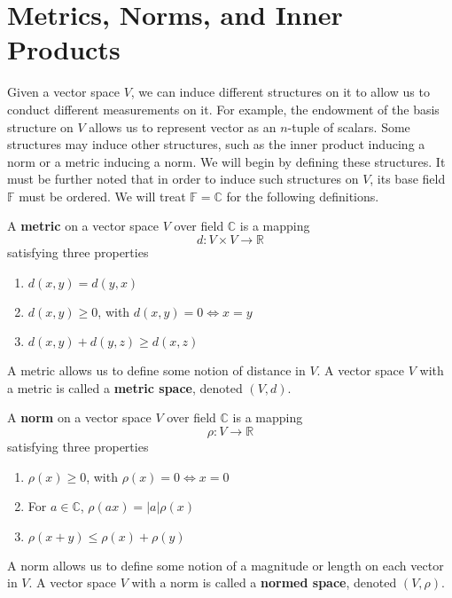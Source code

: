 \section{Metrics, Norms, and Inner Products} 

  Given a vector space $V$, we can induce different structures on it to allow us to conduct different measurements on it. For example, the endowment of the basis structure on $V$ allows us to represent vector as an $n$-tuple of scalars. Some structures may induce other structures, such as the inner product inducing a norm or a metric inducing a norm. We will begin by defining these structures. It must be further noted that in order to induce such structures on $V$, its base field $\mathbb{F}$ must be ordered. We will treat $\mathbb{F} = \mathbb{C}$ for the following definitions. 

  \begin{definition}[Metric]
    A \textbf{metric} on a vector space $V$ over field $\mathbb{C}$ is a mapping
    \begin{equation}
      d: V \times V \longrightarrow \mathbb{R}
    \end{equation}
    satisfying three properties 
    \begin{enumerate}
      \item $d(x, y) = d(y, x)$
      \item $d(x, y) \geq 0$, with $d(x,y) = 0 \iff x=y$
      \item $d(x, y) + d(y,z) \geq d(x,z)$
    \end{enumerate}
    A metric allows us to define some notion of distance in $V$. A vector space $V$ with a metric is called a \textbf{metric space}, denoted $(V, d)$. 
  \end{definition}

  \begin{definition}[Norm]
    A \textbf{norm} on a vector space $V$ over field $\mathbb{C}$ is a mapping 
    \begin{equation}
      \rho: V \longrightarrow \mathbb{R}
    \end{equation}
    satisfying three properties 
    \begin{enumerate}
      \item $\rho (x) \geq 0$, with $\rho(x) = 0 \iff x = 0$
      \item For $a \in \mathbb{C}$, $\rho (a x) = |a| \rho(x)$ 
      \item $\rho(x + y) \leq \rho(x) + \rho(y)$ 
    \end{enumerate}
    A norm allows us to define some notion of a magnitude or length on each vector in $V$. A vector space $V$ with a norm is called a \textbf{normed space}, denoted $(V, \rho)$. 
  \end{definition}

